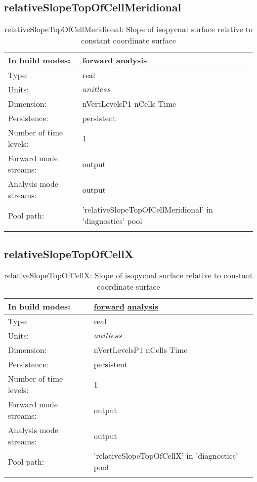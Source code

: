 \subsection[relativeSlopeTopOfCellMeridional]{relativeSlopeTopOfCellMeridional}
\label{subsec:var_sec_diagnostics_relativeSlopeTopOfCellMeridional}
\begin{center}
\begin{longtable}{| p{2.0in} | p{4.0in} |}
        \hline 
        In build modes: & \hyperref[subsec:forward_var_tab_diagnostics]{forward} \hyperref[subsec:analysis_var_tab_diagnostics]{analysis} \\
        \hline 
        Type: & real \\
        \hline 
        Units: & $unitless$ \\
        \hline 
        Dimension: & nVertLevelsP1 nCells Time \\
        \hline 
        Persistence: & persistent \\
        \hline 
        Number of time levels: & 1 \\
        \hline 
		 Forward mode streams: &  output \\
        \hline 
		 Analysis mode streams: &  output \\
        \hline 
            Pool path: & 'relativeSlopeTopOfCellMeridional' in 'diagnostics' pool
 \\
		 \hline 
    \caption{relativeSlopeTopOfCellMeridional: Slope of isopycnal surface relative to constant coordinate surface}
\end{longtable}
\end{center}
\subsection[relativeSlopeTopOfCellX]{relativeSlopeTopOfCellX}
\label{subsec:var_sec_diagnostics_relativeSlopeTopOfCellX}
\begin{center}
\begin{longtable}{| p{2.0in} | p{4.0in} |}
        \hline 
        In build modes: & \hyperref[subsec:forward_var_tab_diagnostics]{forward} \hyperref[subsec:analysis_var_tab_diagnostics]{analysis} \\
        \hline 
        Type: & real \\
        \hline 
        Units: & $unitless$ \\
        \hline 
        Dimension: & nVertLevelsP1 nCells Time \\
        \hline 
        Persistence: & persistent \\
        \hline 
        Number of time levels: & 1 \\
        \hline 
		 Forward mode streams: &  output \\
        \hline 
		 Analysis mode streams: &  output \\
        \hline 
            Pool path: & 'relativeSlopeTopOfCellX' in 'diagnostics' pool
 \\
		 \hline 
    \caption{relativeSlopeTopOfCellX: Slope of isopycnal surface relative to constant coordinate surface}
\end{longtable}
\end{center}
